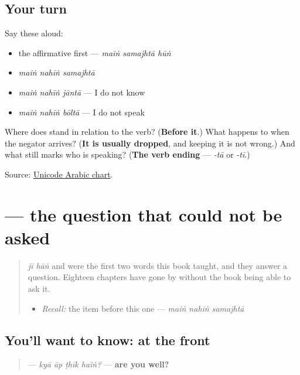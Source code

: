\subsection*{Your turn}
Say these aloud:

\begin{itemize}
\raggedright
  \item the affirmative first — \emph{maiṅ samajhtā hūṅ}
  \item \emph{maiṅ nahīṅ samajhtā}
  \item \emph{maiṅ nahīṅ jāntā} — I do not know
  \item \emph{maiṅ nahīṅ bōltā} — I do not speak
\end{itemize}

\begin{tcolorbox}[breakable,colback=teal!4,colframe=teal!35!black,title={Before you move on}]
Where does \textbf{} stand in relation to the verb? (\textbf{Before it}.) What happens to \textbf{} when the negator arrives? (\textbf{It is usually dropped}, and keeping it is not wrong.) And what still marks who is speaking? (\textbf{The verb ending} — \emph{-tā} or \emph{-tī}.)

Source: \href{https://www.unicode.org/charts/PDF/U0600.pdf}{Unicode Arabic chart}.
\end{tcolorbox}
\section[\texorpdfstring{\ur{کیا} \ur{آپ} \ur{ٹھیک} \ur{ہیں؟} (kyā āp ṭhīk haiṅ?)}{کیا آپ ٹھیک ہیں؟ (kyā āp ṭhīk haiṅ?)}]{    — the question that could not be asked}

\label{lesson:UR-C19-kya-polar}



\begin{quote}
\emph{jī hāṅ} and \textbf{} were the first two words this book taught, and they answer a question. Eighteen chapters have gone by without the book being able to ask it.

\begin{itemize}
\raggedright
  \item \emph{Recall:} the item before this one — \emph{maiṅ nahīṅ samajhtā}
\end{itemize}
\end{quote}

\subsection*{You'll want to know:  at the front}
\begin{quote}
\textbf{   } — \emph{kyā āp ṭhīk haiṅ?} — \textbf{are you well?}
\end{quote}

